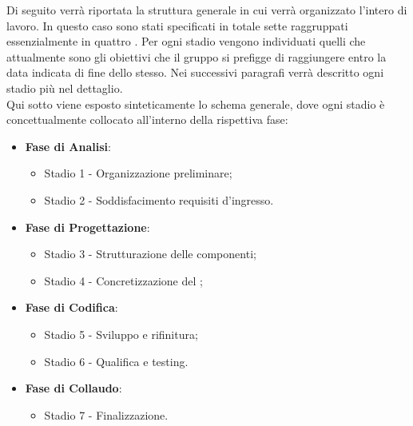 Di seguito verrà riportata la struttura generale in cui verrà organizzato l'intero  di lavoro. In questo caso sono stati specificati in totale sette  raggruppati essenzialmente in quattro . Per ogni stadio vengono individuati quelli che attualmente sono gli obiettivi che il gruppo \Gruppo{} si prefigge di raggiungere entro la data indicata di fine dello stesso. Nei successivi paragrafi verrà descritto ogni stadio più nel dettaglio.\\
Qui sotto viene esposto sinteticamente lo schema generale, dove ogni stadio è concettualmente collocato all'interno della rispettiva fase:

\begin{itemize}
    \item \textbf{Fase di Analisi}:
    \begin{itemize}
        \item Stadio 1 - Organizzazione preliminare;
        \item Stadio 2 - Soddisfacimento requisiti d'ingresso.
    \end{itemize}

    \item \textbf{Fase di Progettazione}:
    \begin{itemize}
        \item Stadio 3 - Strutturazione delle componenti;
        \item Stadio 4 - Concretizzazione del ;
    \end{itemize}

    \item \textbf{Fase di Codifica}:
    \begin{itemize}  
        \item Stadio 5 - Sviluppo e rifinitura;
        \item Stadio 6 - Qualifica e testing.
    \end{itemize}

    \item \textbf{Fase di Collaudo}:
    \begin{itemize}        
        \item Stadio 7 - Finalizzazione.
    \end{itemize}
\end{itemize}

